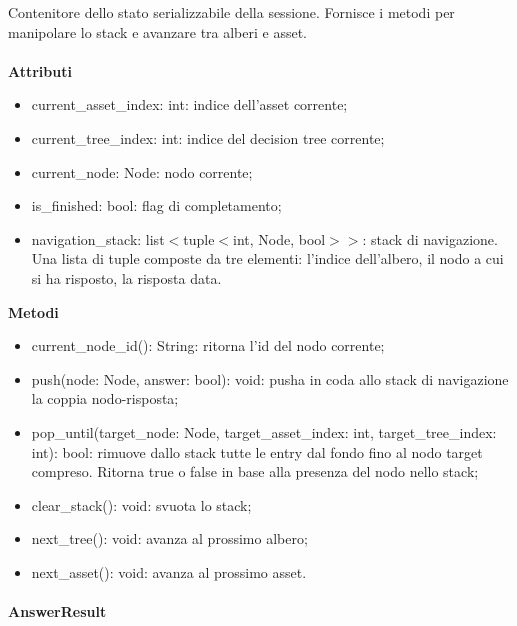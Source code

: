 \documentclass[a4paper,12pt]{article}
\begin{document}
                    Contenitore dello stato serializzabile della sessione. Fornisce i metodi per manipolare lo stack e avanzare tra alberi e asset.\\\\
                    \textbf{Attributi}
                    \begin{itemize}
                        \item {\ttfamily current\_asset\_index: int}: indice dell'asset corrente;
                        \item {\ttfamily current\_tree\_index: int}: indice del decision tree corrente;
                        \item {\ttfamily current\_node: Node}: nodo corrente;
                        \item {\ttfamily is\_finished: bool}: flag di completamento;
                        \item {\ttfamily navigation\_stack: list$<$tuple$<$int, Node, bool$>>$}: stack di navigazione. Una lista di tuple composte da tre elementi: l'indice dell'albero, il nodo a cui si ha risposto, la risposta data. 
                    \end{itemize}
                    \textbf{Metodi}
                    \begin{itemize}
                        \item {\ttfamily current\_node\_id(): String}: ritorna l'id del nodo corrente;
                        \item {\ttfamily push(node: Node, answer: bool): void}: pusha in coda allo stack di navigazione la coppia nodo-risposta;
                        \item {\ttfamily pop\_until(target\_node: Node, target\_asset\_index: int, target\_tree\_index: int): bool}: rimuove dallo stack tutte le entry dal fondo fino al nodo target compreso. Ritorna true o false in base alla presenza del nodo nello stack;
                        \item {\ttfamily clear\_stack(): void}: svuota lo stack;
                        \item {\ttfamily next\_tree(): void}: avanza al prossimo albero;
                        \item {\ttfamily next\_asset(): void}: avanza al prossimo asset.
                    \end{itemize}

                    
                \paragraph{AnswerResult}\mbox{}\\
\end{document}
